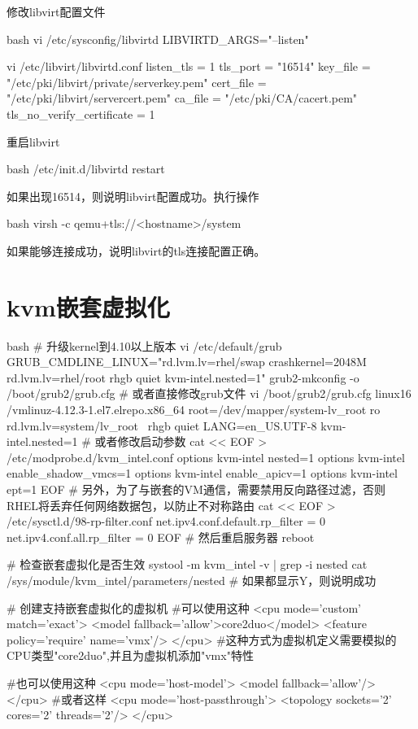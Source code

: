 修改libvirt配置文件
\begin{code-block}{bash}
vi /etc/sysconfig/libvirtd
LIBVIRTD_ARGS="--listen"

vi /etc/libvirt/libvirtd.conf
listen_tls = 1
tls_port = "16514"
key_file = "/etc/pki/libvirt/private/serverkey.pem"
cert_file = "/etc/pki/libvirt/servercert.pem"
ca_file = "/etc/pki/CA/cacert.pem"
tls_no_verify_certificate = 1
\end{code-block}

重启libvirt
\begin{code-block}{bash}
/etc/init.d/libvirtd restart
\end{code-block}

如果出现16514，则说明libvirt配置成功。执行操作
\begin{code-block}{bash}
virsh -c qemu+tls://<hostname>/system
\end{code-block}

如果能够连接成功，说明libvirt的tls连接配置正确。

\section{kvm嵌套虚拟化}
\begin{code-block}{bash}
# 升级kernel到4.10以上版本
vi /etc/default/grub
GRUB_CMDLINE_LINUX="rd.lvm.lv=rhel/swap crashkernel=2048M rd.lvm.lv=rhel/root rhgb quiet kvm-intel.nested=1"
grub2-mkconfig -o /boot/grub2/grub.cfg
# 或者直接修改grub文件
vi /boot/grub2/grub.cfg
linux16 /vmlinuz-4.12.3-1.el7.elrepo.x86_64 root=/dev/mapper/system-lv_root ro rd.lvm.lv=system/lv_root \
    rhgb quiet LANG=en_US.UTF-8 kvm-intel.nested=1
# 或者修改启动参数
cat << EOF > /etc/modprobe.d/kvm_intel.conf
options kvm-intel nested=1
options kvm-intel enable_shadow_vmcs=1
options kvm-intel enable_apicv=1
options kvm-intel ept=1
EOF
# 另外，为了与嵌套的VM通信，需要禁用反向路径过滤，否则RHEL将丢弃任何网络数据包，以防止不对称路由
cat << EOF > /etc/sysctl.d/98-rp-filter.conf
net.ipv4.conf.default.rp_filter = 0
net.ipv4.conf.all.rp_filter = 0
EOF
# 然后重启服务器
reboot

# 检查嵌套虚拟化是否生效
systool -m kvm_intel -v   | grep -i nested
cat /sys/module/kvm_intel/parameters/nested
# 如果都显示Y，则说明成功

# 创建支持嵌套虚拟化的虚拟机
#可以使用这种
  <cpu mode='custom' match='exact'>
    <model fallback='allow'>core2duo</model>
    <feature policy='require' name='vmx'/>
  </cpu>
#这种方式为虚拟机定义需要模拟的CPU类型"core2duo",并且为虚拟机添加"vmx"特性

#也可以使用这种
  <cpu mode='host-model'>
    <model fallback='allow'/>
  </cpu>
#或者这样
 <cpu mode='host-passthrough'>
    <topology sockets='2' cores='2' threads='2'/>
 </cpu>
\end{code-block}

